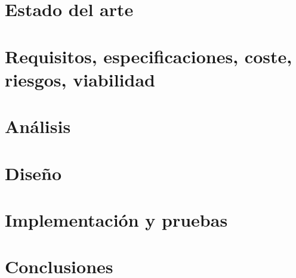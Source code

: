\documentclass[twoside,spanish,a4paper,12pt]{tfg}
\begin{document}
\chapter{Estado del arte}


\chapter{Requisitos, especificaciones, coste, riesgos, viabilidad}


\chapter{Análisis}


\chapter{Diseño}


\chapter{Implementación y pruebas}

\chapter{Conclusiones}





%



\end{document}

